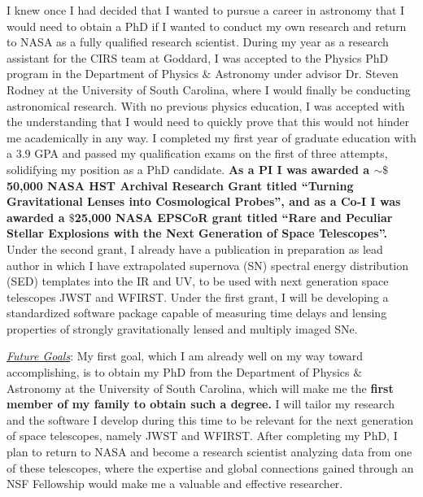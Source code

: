 I  knew once  I  had decided  that  I  wanted to  pursue  a career  in
astronomy that I would need to obtain  a PhD if I wanted to conduct my
own  research  and  return  to  NASA as  a  fully  qualified  research
scientist.  During my  year as a research assistant for  the CIRS team
at  Goddard,  I  was  accepted  to the  Physics  PhD  program  in  the
Department of Physics $\&$ Astronomy  under advisor Dr.  Steven Rodney
at  the  University  of  South  Carolina, where  I  would  finally  be
conducting astronomical research.  With no previous physics education,
I was  accepted with the  understanding that  I would need  to quickly
prove  that this  would  not hinder  me academically  in  any way.   I
completed  my first  year of  graduate education  with a  3.9 GPA  and
passed  my  qualification  exams  on  the  first  of  three  attempts,
solidifying  my position  as  a PhD  candidate. \textbf{As a PI  I was  awarded
a $\sim\$$50,000  NASA HST Archival Research  Grant titled ``Turning
Gravitational  Lenses into  Cosmological Probes'',  and as a Co-I I  was
awarded  a $\$$25,000  NASA  EPSCoR grant  titled  ``Rare and  Peculiar
Stellar    Explosions   with    the   Next    Generation   of    Space
Telescopes''.} Under the second  grant, I already have  a publication in
preparation as lead author in which I have extrapolated supernova (SN)
spectral energy distribution (SED) templates into the IR and UV, to be
used with next generation space telescopes JWST and WFIRST.  Under the
first grant,  I will  be developing  a standardized  software package
capable of  measuring time delays  and lensing properties  of strongly
gravitationally lensed and multiply imaged SNe.

\underline{\textit{Future Goals}}:
My first goal, which I am already well on my way toward accomplishing,
is to obtain  my PhD from the Department of  Physics $\&$ Astronomy at
the University of South Carolina, which  will make me the \textbf{first member
of my family  to obtain such a  degree.} I will tailor  my research and
the software  I develop during this  time to be relevant  for the next
generation  of  space  telescopes,  namely  JWST  and  WFIRST.   After
completing my  PhD, I  plan to  return to NASA  and become  a research
scientist  analyzing data  from  one of  these  telescopes, where  the
expertise  and global  connections  gained through  an NSF  Fellowship
would make me a valuable and effective researcher.

